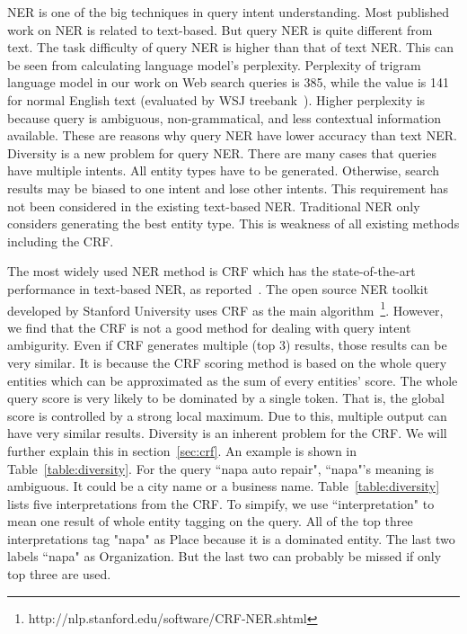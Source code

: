 \documentclass[11pt]{article}
\begin{document}
NER is one of the big techniques in query intent understanding. Most published work on NER is related to text-based. But  query NER is quite different from text. The task difficulty of query NER is higher than that of text NER. This can be seen from calculating language model's perplexity. Perplexity of trigram language model in our work on Web search queries is 385, while the value is 141 for normal English text (evaluated by WSJ treebank~\cite{Mikolov:2012}).  Higher perplexity is because query is ambiguous, non-grammatical, and less  contextual information available. These are reasons why query NER have lower accuracy than text NER. Diversity is a new problem for query NER. There are many cases that  queries have multiple intents. All entity types have to be generated. Otherwise, search results may be biased to one intent and lose other intents.   This requirement has not been considered in the existing text-based NER. Traditional NER only considers generating the best entity type. This is weakness of all existing methods including the CRF.
 
The most widely used NER method is CRF which has  the state-of-the-art performance in text-based NER, as reported~\cite{McCallum:2003:ERN:1119176.1119206}. The open source NER toolkit developed by Stanford University uses CRF as the main algorithm~\footnote{http://nlp.stanford.edu/software/CRF-NER.shtml}.  However,  we find that the CRF is not a good method for dealing with  query intent ambigurity.  Even if CRF generates multiple (top 3) results, those results can be very similar. It is because the CRF scoring method is based on the whole query entities which can be approximated as the  sum of every entities' score. The whole query score is very likely to be dominated by a single token. That is, the global score is controlled by a strong local maximum.   Due to this, multiple output can have very similar results. Diversity is an inherent problem for the CRF. We will further explain this in section~\ref{sec:crf}.
 An example is shown in Table~\ref{table:diversity}. For the query ``napa auto repair", ``napa"'s meaning is ambiguous. It could be a city name or a business name.  Table~\ref{table:diversity} lists five interpretations from the CRF.  To simpify, we use ``interpretation" to mean one result of whole entity tagging on the query. All of the top three interpretations tag "napa" as Place because it is a dominated entity. The last two labels ``napa" as Organization. But the last two can probably be missed if only top three are used. 
\end{document}
